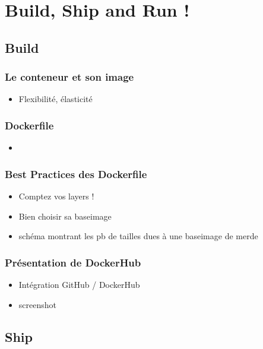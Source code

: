 \section[Docker]{Build, Ship and Run !}

\subsection[Docker]{Build}

  \begin{frame}
    \frametitle{Le conteneur et son image}
    \begin{itemize}
      \item Flexibilité, élasticité
    \end{itemize}
  \end{frame}

  \begin{frame}
    \frametitle{Dockerfile}
    \begin{itemize}
      \item
    \end{itemize}
  \end{frame}

  \begin{frame}
    \frametitle{Best Practices des Dockerfile}
    \begin{itemize}
      \item Comptez vos layers !
      \item Bien choisir sa baseimage
      \item schéma montrant les pb de tailles dues à une baseimage de merde
    \end{itemize}
  \end{frame}

  \begin{frame}
    \frametitle{Présentation de DockerHub}
    \begin{itemize}
      \item Intégration GitHub / DockerHub
      \item screenshot
    \end{itemize}
  \end{frame}

\subsection[Docker]{Ship}

